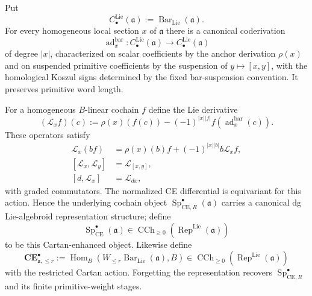 \begin{proposition}
\label{prop:as-ce-cartan-representation}
Put
\[
    C_\bullet^{\mathrm{Lie}}(\mathfrak a)
    :=
    \operatorname{Bar}_{\mathrm{Lie}}(\mathfrak a).
\]
For every homogeneous local section $x$ of $\mathfrak a$ there is a canonical
coderivation
\[
    \operatorname{ad}^{\mathrm{bar}}_x:
    C_\bullet^{\mathrm{Lie}}(\mathfrak a)
    \longrightarrow
    C_\bullet^{\mathrm{Lie}}(\mathfrak a)
\]
of degree $|x|$, characterized on scalar coefficients by the anchor derivation
$\rho(x)$ and on suspended primitive coefficients by the suspension of
$y\mapsto[x,y]$, with the homological Koszul signs determined by the fixed
bar-suspension convention.  It preserves primitive word length.

For a homogeneous $B$-linear cochain $f$ define the Lie derivative
\[
\boxed{
    (\mathcal L_xf)(c)
    :=
    \rho(x)(f(c))
    -
    (-1)^{|x||f|}
    f\left(\operatorname{ad}^{\mathrm{bar}}_x(c)\right).
}
\]
These operators satisfy
\[
\boxed{
\begin{aligned}
    \mathcal L_x(bf)
    &=
    \rho(x)(b)f
    +(-1)^{|x||b|}b\mathcal L_xf,\\
    [\mathcal L_x,\mathcal L_y]
    &=
    \mathcal L_{[x,y]},\\
    [d,\mathcal L_x]
    &=
    \mathcal L_{dx},
\end{aligned}}
\]
with graded commutators.  The normalized CE differential is equivariant for
this action.  Hence the underlying cochain object
$\operatorname{Sp}_{\mathrm{CE},R}^{\bullet}(\mathfrak a)$ carries a
canonical dg Lie-algebroid representation structure; define
\[
\boxed{
    \operatorname{Sp}_{\mathrm{CE}}^{\bullet}(\mathfrak a)
    \in
    \operatorname{CCh}_{\geq0}
    \left(\operatorname{Rep}^{\mathrm{Lie}}(\mathfrak a)\right)
}
\]
to be this Cartan-enhanced object.  Likewise define
\[
\boxed{
    \mathbf{CE}^{\bullet}_{\mathfrak a,\le r}
    :=
    \operatorname{Hom}_B
    \left(
        W_{\le r}\operatorname{Bar}_{\mathrm{Lie}}(\mathfrak a),
        B
    \right)
    \in
    \operatorname{CCh}_{\geq0}
    \left(\operatorname{Rep}^{\mathrm{Lie}}(\mathfrak a)\right)
}
\]
with the restricted Cartan action.  Forgetting the representation recovers
$\operatorname{Sp}_{\mathrm{CE},R}^{\bullet}$ and its finite
primitive-weight stages.
\end{proposition}

